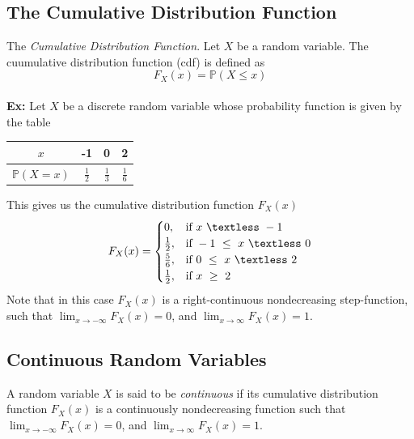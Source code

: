 \documentclass{article}
\newcommand{\ti}[1]{\textit{#1}}
\newcommand{\bbP}{\mathbb{P}}
\newcommand{\lt}{\textless}
\begin{document}
\subsection{The Cumulative Distribution Function}
The \ti{Cumulative Distribution Function}. Let $X$ be a random variable. The cuumulative distribution function (cdf) is defined as
\[F_{X}(x) = \bbP(X \leq x)\]\\
\textbf{Ex:} Let $X$ be a discrete random variable whose probability function is given by the table
\begin{center}
\begin{tabular}{| c || c | c | c |}
\hline
$x$ & -1 & 0 & 2\\
\hline
$\bbP(X=x)$ & $\frac{1}{2}$ & $\frac{1}{3}$ & $\frac{1}{6}$\\
\hline
\end{tabular}
\end{center} 
This gives us the cumulative distribution function $F_{X}(x)$
\[ F_{X}(x) =
\begin{cases}
	0, &\text{if}\ x\ \lt\ -1\\
	\frac{1}{2}, &\text{if}\ -1\ \leq\ x\ \lt\ 0\\
	\frac{5}{6}, &\text{if}\ 0\ \leq\ x\ \lt\ 2\\
	\frac{1}{2}, &\text{if}\ x\ \geq\ 2\\
\end{cases}
\]
Note that in this case $F_{X}(x)$ is a right-continuous nondecreasing step-function, such that $\lim_{x\to-\infty} F_{X}(x) = 0$, and $\lim_{x\to\infty} F_{X}(x) = 1$.
\subsection{Continuous Random Variables}
A random variable $X$ is said to be \ti{continuous} if its cumulative distribution function $F_{X}(x)$ is a continuously nondecreasing function such that $\lim_{x\to-\infty} F_{X}(x) = 0$, and $\lim_{x\to\infty} F_{X}(x) = 1$.
\end{document}
